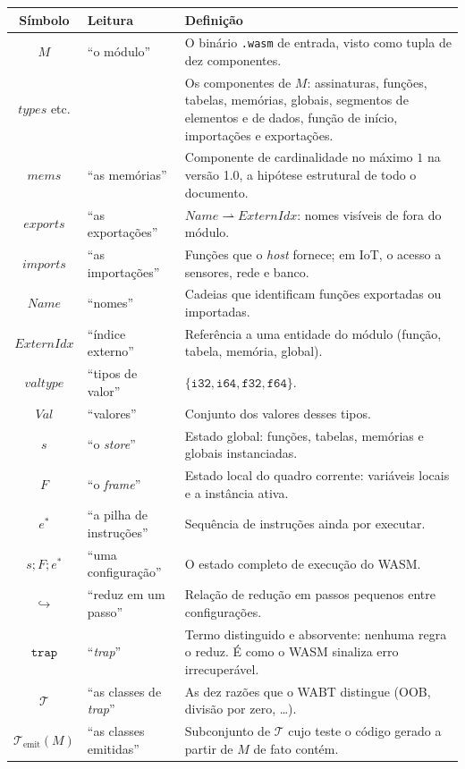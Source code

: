 \documentclass[11pt,a4paper]{article}
\theoremstyle{definition}
\newcommand{\code}[1]{\texttt{#1}}
\begin{document}
\begin{tabularx}{\textwidth}{@{}c l X@{}}
\toprule
\textbf{Símbolo} & \textbf{Leitura} & \textbf{Definição} \\
\midrule
$M$ & ``o módulo'' & O binário \code{.wasm} de entrada, visto como tupla de dez componentes. \\
$\mathit{types}$ etc. &  & Os componentes de $M$: assinaturas, funções, tabelas, memórias, globais, segmentos de elementos e de dados, função de início, importações e exportações. \\
$\mathit{mems}$ & ``as memórias'' & Componente de cardinalidade no máximo $1$ na versão 1.0, a hipótese estrutural de todo o documento. \\
$\mathit{exports}$ & ``as exportações'' & $\mathit{Name} \rightharpoonup \mathit{ExternIdx}$: nomes visíveis de fora do módulo. \\
$\mathit{imports}$ & ``as importações'' & Funções que o \emph{host} fornece; em IoT, o acesso a sensores, rede e banco. \\
$\mathit{Name}$ & ``nomes'' & Cadeias que identificam funções exportadas ou importadas. \\
$\mathit{ExternIdx}$ & ``índice externo'' & Referência a uma entidade do módulo (função, tabela, memória, global). \\
$\mathit{valtype}$ & ``tipos de valor'' & $\{\mathtt{i32}, \mathtt{i64}, \mathtt{f32}, \mathtt{f64}\}$. \\
$\mathit{Val}$ & ``valores'' & Conjunto dos valores desses tipos. \\
$s$ & ``o \emph{store}'' & Estado global: funções, tabelas, memórias e globais instanciadas. \\
$F$ & ``o \emph{frame}'' & Estado local do quadro corrente: variáveis locais e a instância ativa. \\
$e^{*}$ & ``a pilha de instruções'' & Sequência de instruções ainda por executar. \\
$s;F;e^{*}$ & ``uma configuração'' & O estado completo de execução do WASM. \\
$\hookrightarrow$ & ``reduz em um passo'' & Relação de redução em passos pequenos entre configurações. \\
$\mathtt{trap}$ & ``\emph{trap}'' & Termo distinguido e absorvente: nenhuma regra o reduz. É como o WASM sinaliza erro irrecuperável. \\
$\mathcal{T}$ & ``as classes de \emph{trap}'' & As dez razões que o WABT distingue (OOB, divisão por zero, \dots). \\
$\mathcal{T}_{\mathrm{emit}}(M)$ & ``as classes emitidas'' & Subconjunto de $\mathcal{T}$ cujo teste o código gerado a partir de $M$ de fato contém. \\
\bottomrule
\end{tabularx}
\end{document}
